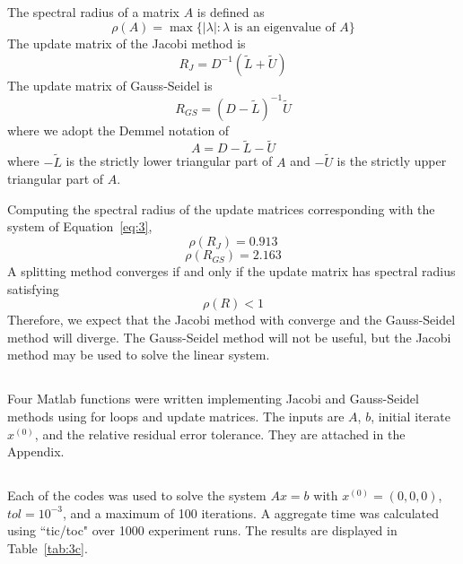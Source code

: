 \documentclass[11pt]{article} %
\begin{document}
\subsection{} %
The spectral radius of a matrix $A$ is defined as
\begin{equation}
\rho(A) = \max \{| \lambda | : \lambda \mbox{ is an eigenvalue of } A \}
\label{eq:spectral}
\end{equation}
The update matrix of the Jacobi method is 
\begin{equation}
R_J = D^{-1}( \tilde{L} +\tilde{U})
\end{equation}
The update matrix of Gauss-Seidel is
\begin{equation}
R_{GS} = (D - \tilde{L})^{-1} \tilde{U}
\end{equation}
where we adopt the Demmel notation of 
\begin{equation}
A = D - \tilde{L} - \tilde{U} 
\end{equation}
where $-\tilde{L}$ is the strictly lower triangular part of $A$ and $-\tilde{U}$ is the strictly upper triangular part of $A$.

Computing the spectral radius of the update matrices corresponding with the system of Equation~\ref{eq:3},
\begin{equation}
\boxed{\rho(R_{J}) = 0.913}
\end{equation}
\begin{equation}
\boxed{\rho(R_{GS}) = 2.163}
\end{equation}
A splitting method converges if and only if the update matrix has spectral radius satisfying 
\begin{equation}
\rho(R) < 1
\end{equation}
Therefore, we expect that the Jacobi method with converge and the Gauss-Seidel method will diverge. The Gauss-Seidel method will not be useful, but the Jacobi method may be used to solve the linear system. 

\subsection{} %
Four  Matlab functions were written implementing Jacobi and Gauss-Seidel methods using for loops and update matrices. The inputs are $A$, $b$, initial iterate $x^{(0)}$, and the relative residual error tolerance. They are attached in the Appendix.

\subsection{} %
Each of the codes was used to solve the system $Ax = b$ with  $x^{(0)} = (0,0,0)$, $tol = 10^{-3}$, and a maximum of 100 iterations. A aggregate time was calculated using ``tic/toc" over 1000 experiment runs. The results are displayed in Table~\ref{tab:3c}.
\end{document}
